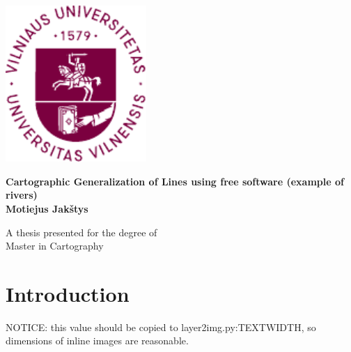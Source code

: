 \documentclass[a4paper]{article}
\title{\MYTITLE}
\author{\MYAUTHOR}
\date{\VCDescribe}
\newcommand{\WM}{Wang--M{\"u}ller}
\newcommand{\MYTITLE}{Cartographic Generalization of Lines using free software (example of rivers)}
\newcommand{\MYAUTHOR}{Motiejus Jakštys}
\begin{document}
\begin{titlepage}
    \begin{center}
        \includegraphics[width=0.4\textwidth]{vu}

        \huge
        \textbf{\MYTITLE} \\[4ex]

        \LARGE
        \textbf{\MYAUTHOR} \\[8ex]

        \vfill

        A thesis presented for the degree of\\
        Master in Cartography \\[3ex]

        \large
        \VCDescribe
    \end{center}
\end{titlepage}

\begin{abstract}
\label{sec:abstract}
Current open-source line generalization solutions have their roots in
    mathematics and geometry, and are not fit for natural objects like rivers
    and coastlines. This paper discusses our implementation of {\WM} algorithm
    under and open-source license, explains things that we would had
    appreciated in the original paper and compares our results to different
    generalization algorithms.
\end{abstract}

\newpage

\tableofcontents
\listoffigures

\newpage

\section{Introduction}
\label{sec:introduction}

\iffalse
NOTICE: this value should be copied to layer2img.py:TEXTWIDTH, so dimensions
of inline images are reasonable.
\end{document}
